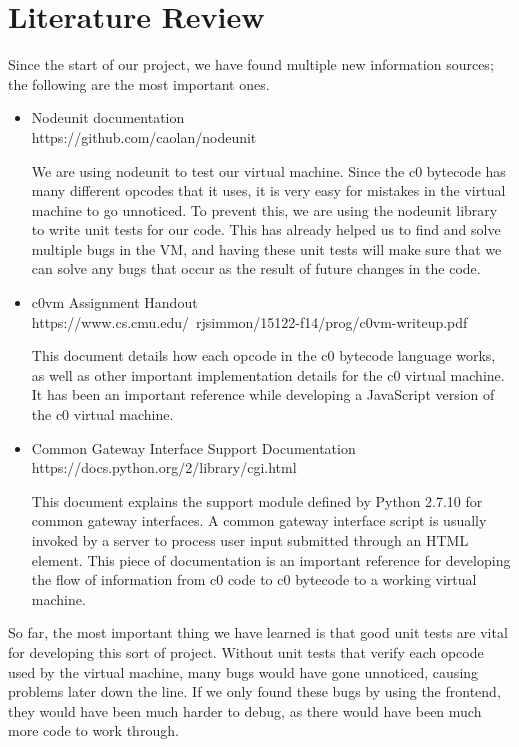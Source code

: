 \documentclass[11pt]{article}
\begin{document}
\section{Literature Review}
Since the start of our project, we have found multiple new information sources;
the following are the most important ones.
\begin{itemize}
\item Nodeunit documentation \\
    https://github.com/caolan/nodeunit
    \par
    We are using nodeunit to test our virtual machine.
    Since the c0 bytecode has many different opcodes that it uses, it is very
    easy for mistakes in the virtual machine to go unnoticed.
    To prevent this, we are using the nodeunit library to write unit tests for
    our code.
    This has already helped us to find and solve multiple bugs in the VM, and
    having these unit tests will make sure that we can solve any bugs that
    occur as the result of future changes in the code.
\item c0vm Assignment Handout \\
    https://www.cs.cmu.edu/~rjsimmon/15122-f14/prog/c0vm-writeup.pdf
    \par
    This document details how each opcode in the c0 bytecode language works,
    as well as other important implementation details for the c0 virtual
    machine. It has been an important reference while developing a JavaScript
    version of the c0 virtual machine.
\item Common Gateway Interface Support Documentation \\
    https://docs.python.org/2/library/cgi.html
    \par
    This document explains the support module defined by Python 2.7.10 for
    common gateway interfaces. A common gateway interface script is usually
    invoked by a server to process user input submitted through an HTML
    element. This piece of documentation is an important reference for
    developing the flow of information from c0 code to c0 bytecode to a
    working virtual machine.
\end{itemize}
So far, the most important thing we have learned is that good unit tests are
vital for developing this sort of project. Without unit tests that verify
each opcode used by the virtual machine, many bugs would have gone unnoticed,
causing problems later down the line. If we only found these bugs by using
the frontend, they would have been much harder to debug, as there would have
been much more code to work through.
\end{document}
